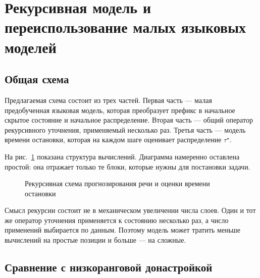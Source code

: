 \section{Рекурсивная модель и переиспользование малых языковых моделей}

\subsection{Общая схема}

Предлагаемая схема состоит из трех частей. Первая часть --- малая предобученная языковая модель, которая преобразует префикс в начальное скрытое состояние и начальное распределение. Вторая часть --- общий оператор рекурсивного уточнения, применяемый несколько раз. Третья часть --- модель времени остановки, которая на каждом шаге оценивает распределение \(\tau^\star\).

На рис.~\ref{fig:recursive_scheme} показана структура вычислений. Диаграмма намеренно оставлена простой: она отражает только те блоки, которые нужны для постановки задачи.


\begin{figure}[H]
\centering
{}
\caption{Рекурсивная схема прогнозирования речи и оценки времени остановки}
\label{fig:recursive_scheme}
\end{figure}

Смысл рекурсии состоит не в механическом увеличении числа слоев. Один и тот же оператор уточнения применяется к состоянию несколько раз, а число применений выбирается по данным. Поэтому модель может тратить меньше вычислений на простые позиции и больше --- на сложные.

\subsection{Сравнение с низкоранговой донастройкой}

